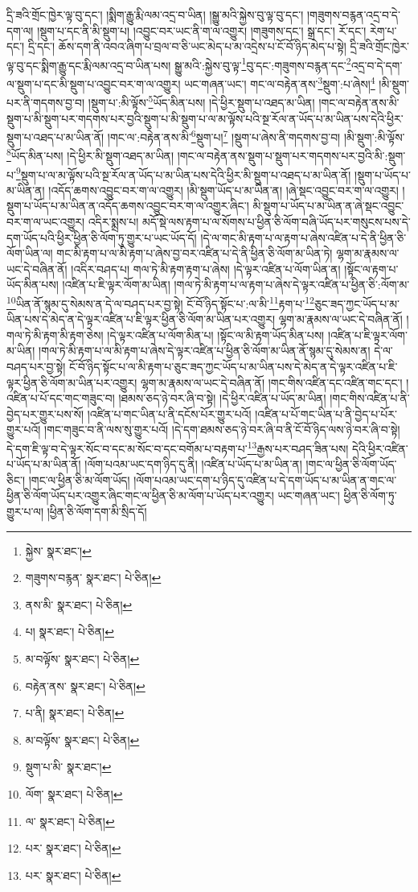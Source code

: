 དྲི་ཟའི་གྲོང་ཁྱེར་ལྟ་བུ་དང་། །སྨིག་རྒྱུ་རྨི་ལམ་འདྲ་བ་ཡིན། །སྒྱུ་མའི་སྐྱེས་བུ་ལྟ་བུ་དང་། །གཟུགས་བརྙན་འདྲ་བ་དེ་དག་ལ། །སྡུག་པ་དང་ནི་མི་སྡུག་པ། །འབྱུང་བར་ཡང་ནི་ག་ལ་འགྱུར། །གཟུགས་དང་། སྒྲ་དང་། རོ་དང་། རེག་པ་དང་། དྲི་དང་། ཆོས་དག་ནི་འབའ་ཞིག་པ་བྲལ་བ་ཅི་ཡང་མེད་པ་མ་འདྲེས་པ་ངོ་བོ་ཉིད་མེད་པ་སྟེ། དྲི་ཟའི་གྲོང་ཁྱེར་ལྟ་བུ་དང་སྨིག་རྒྱུ་དང་རྨི་ལམ་འདྲ་བ་ཡིན་པས། སྒྱུ་མའི་:སྐྱེས་བུ་ལྟ་\footnote{སྐྱེས་  སྣར་ཐང་། }བུ་དང་:གཟུགས་བརྙན་དང་\footnote{གཟུགས་བརྙན་  སྣར་ཐང་།  པེ་ཅིན། }འདྲ་བ་དེ་དག་ལ་སྡུག་པ་དང་མི་སྡུག་པ་འབྱུང་བར་ག་ལ་འགྱུར། ཡང་གཞན་ཡང་། གང་ལ་བརྟེན་ནས་\footnote{ནས་མི་  སྣར་ཐང་།  པེ་ཅིན། }སྡུག་:པ་ཞེས།\footnote{པ།  སྣར་ཐང་།  པེ་ཅིན། } །མི་སྡུག་པར་ནི་གདགས་བྱ་བ། །སྡུག་པ་:མི་ལྟོས་\footnote{མ་བལྟོས་  སྣར་ཐང་།  པེ་ཅིན། }ཡོད་མིན་པས། །དེ་ཕྱིར་སྡུག་པ་འཐད་མ་ཡིན། །གང་ལ་བརྟེན་ནས་མི་སྡུག་པ་མི་སྡུག་པར་གདགས་པར་བྱའི་སྡུག་པ་མི་སྡུག་པ་ལ་མ་ལྟོས་པའི་སྔ་རོལ་ན་ཡོད་པ་མ་ཡིན་པས་དེའི་ཕྱིར་སྡུག་པ་འཐད་པ་མ་ཡིན་ནོ། །གང་ལ་:བརྟེན་ནས་མི་\footnote{བརྟེན་ནས་  སྣར་ཐང་།  པེ་ཅིན། }སྡུག་པ།\footnote{པ་ནི།  སྣར་ཐང་།  པེ་ཅིན། } །སྡུག་པ་ཞེས་ནི་གདགས་བྱ་བ། །མི་སྡུག་:མི་ལྟོས་\footnote{མ་བལྟོས་  སྣར་ཐང་།  པེ་ཅིན། }ཡོད་མིན་པས། །དེ་ཕྱིར་མི་སྡུག་འཐད་མ་ཡིན། །གང་ལ་བརྟེན་ནས་སྡུག་པ་སྡུག་པར་གདགས་པར་བྱའི་མི་:སྡུག་པ་\footnote{སྡུག་པ་མི་  སྣར་ཐང་། }སྡུག་པ་ལ་མ་ལྟོས་པའི་སྔ་རོལ་ན་ཡོད་པ་མ་ཡིན་པས་དེའི་ཕྱིར་མི་སྡུག་པ་འཐད་པ་མ་ཡིན་ནོ། །སྡུག་པ་ཡོད་པ་མ་ཡིན་ན། །འདོད་ཆགས་འབྱུང་བར་ག་ལ་འགྱུར། །མི་སྡུག་ཡོད་པ་མ་ཡིན་ན། །ཞེ་སྡང་འབྱུང་བར་ག་ལ་འགྱུར། །སྡུག་པ་ཡོད་པ་མ་ཡིན་ན་འདོད་ཆགས་འབྱུང་བར་ག་ལ་འགྱུར་ཞིང་། མི་སྡུག་པ་ཡོད་པ་མ་ཡིན་ན་ཞེ་སྡང་འབྱུང་བར་ག་ལ་ཡང་འགྱུར། འདིར་སྨྲས་པ། མདོ་སྡེ་ལས་རྟག་པ་ལ་སོགས་པ་ཕྱིན་ཅི་ལོག་བཞི་ཡོད་པར་གསུངས་པས་དེ་དག་ཡོད་པའི་ཕྱིར་ཕྱིན་ཅི་ལོག་ཏུ་གྱུར་པ་ཡང་ཡོད་དོ། །དེ་ལ་གང་མི་རྟག་པ་ལ་རྟག་པ་ཞེས་འཛིན་པ་དེ་ནི་ཕྱིན་ཅི་ལོག་ཡིན་ལ། གང་མི་རྟག་པ་ལ་མི་རྟག་པ་ཞེས་བྱ་བར་འཛིན་པ་དེ་ནི་ཕྱིན་ཅི་ལོག་མ་ཡིན་ཏེ། ལྷག་མ་རྣམས་ལ་ཡང་དེ་བཞིན་ནོ། །འདིར་བཤད་པ། གལ་ཏེ་མི་རྟག་རྟག་པ་ཞེས། །དེ་ལྟར་འཛིན་པ་ལོག་ཡིན་ན། །སྟོང་ལ་རྟག་པ་ཡོད་མིན་པས། །འཛིན་པ་ཇི་ལྟར་ལོག་མ་ཡིན། །གལ་ཏེ་མི་རྟག་པ་ལ་རྟག་པ་ཞེས་དེ་ལྟར་འཛིན་པ་ཕྱིན་ཅི་:ལོག་མ་\footnote{ལོག་  སྣར་ཐང་།  པེ་ཅིན། }ཡིན་ནོ་སྙམ་དུ་སེམས་ན་དེ་ལ་བཤད་པར་བྱ་སྟེ། ངོ་བོ་ཉིད་སྟོང་པ་:ལ་མི་\footnote{ལ་  སྣར་ཐང་།  པེ་ཅིན། }རྟག་པ་\footnote{པར་  སྣར་ཐང་།  པེ་ཅིན། }ཅུང་ཟད་ཀྱང་ཡོད་པ་མ་ཡིན་པས་དེ་མེད་ན་དེ་ལྟར་འཛིན་པ་ཇི་ལྟར་ཕྱིན་ཅི་ལོག་མ་ཡིན་པར་འགྱུར། ལྷག་མ་རྣམས་ལ་ཡང་དེ་བཞིན་ནོ། །གལ་ཏེ་མི་རྟག་མི་རྟག་ཅེས། །དེ་ལྟར་འཛིན་པ་ལོག་མིན་པ། །སྟོང་ལ་མི་རྟག་ཡོད་མིན་པས། །འཛིན་པ་ཇི་ལྟར་ལོག་མ་ཡིན། །གལ་ཏེ་མི་རྟག་པ་ལ་མི་རྟག་པ་ཞེས་དེ་ལྟར་འཛིན་པ་ཕྱིན་ཅི་ལོག་མ་ཡིན་ནོ་སྙམ་དུ་སེམས་ན། དེ་ལ་བཤད་པར་བྱ་སྟེ། ངོ་བོ་ཉིད་སྟོང་པ་ལ་མི་རྟག་པ་ཅུང་ཟད་ཀྱང་ཡོད་པ་མ་ཡིན་པས་དེ་མེད་ན་དེ་ལྟར་འཛིན་པ་ཇི་ལྟར་ཕྱིན་ཅི་ལོག་མ་ཡིན་པར་འགྱུར། ལྷག་མ་རྣམས་ལ་ཡང་དེ་བཞིན་ནོ། །གང་གིས་འཛིན་དང་འཛིན་གང་དང་། །འཛིན་པ་པོ་དང་གང་གཟུང་བ། །ཐམས་ཅད་ཉེ་བར་ཞི་བ་སྟེ། །དེ་ཕྱིར་འཛིན་པ་ཡོད་མ་ཡིན། །གང་གིས་འཛིན་པ་ནི་བྱེད་པར་གྱུར་པས་སོ། །འཛིན་པ་གང་ཡིན་པ་ནི་དངོས་པོར་གྱུར་པའོ། །འཛིན་པ་པོ་གང་ཡིན་པ་ནི་བྱེད་པ་པོར་གྱུར་པའོ། །གང་གཟུང་བ་ནི་ལས་སུ་གྱུར་པའོ། །དེ་དག་ཐམས་ཅད་ཉེ་བར་ཞི་བ་ནི་ངོ་བོ་ཉིད་ལས་ཉེ་བར་ཞི་བ་སྟེ། དེ་དག་ཇི་ལྟ་བ་དེ་ལྟར་སོང་བ་དང་མ་སོང་བ་དང་བགོམ་པ་བརྟག་པ་\footnote{པར་  སྣར་ཐང་།  པེ་ཅིན། }རྒྱས་པར་བཤད་ཟིན་པས། དེའི་ཕྱིར་འཛིན་པ་ཡོད་པ་མ་ཡིན་ནོ། །ལོག་པའམ་ཡང་དག་ཉིད་དུ་ནི། །འཛིན་པ་ཡོད་པ་མ་ཡིན་ན། །གང་ལ་ཕྱིན་ཅི་ལོག་ཡོད་ཅིང་། །གང་ལ་ཕྱིན་ཅི་མ་ལོག་ཡོད། །ལོག་པའམ་ཡང་དག་པ་ཉིད་དུ་འཛིན་པ་དེ་དག་ཡོད་པ་མ་ཡིན་ན་གང་ལ་ཕྱིན་ཅི་ལོག་ཡོད་པར་འགྱུར་ཞིང་གང་ལ་ཕྱིན་ཅི་མ་ལོག་པ་ཡོད་པར་འགྱུར། ཡང་གཞན་ཡང་། ཕྱིན་ཅི་ལོག་ཏུ་གྱུར་པ་ལ། །ཕྱིན་ཅི་ལོག་དག་མི་སྲིད་དོ། 